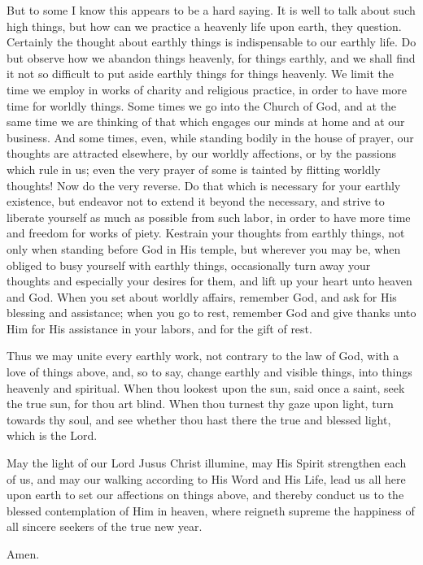 But to some I know this appears to be a hard 
saying. It is well to talk about such high 
things, but how can we practice a heavenly life 
upon earth, they question. Certainly the 
thought about earthly things is indispensable to 
our earthly life. Do but observe how we 
abandon things heavenly, for things earthly, 
and we shall find it not so difficult to put aside 
earthly things for things heavenly. We limit 
the time we employ in works of charity and 
religious practice, in order to have more time 
for worldly things. Some times we go into the 
Church of God, and at the same time we are 
thinking of that which engages our minds at 
home and at our business. And some times, 
even, while standing bodily in the house of 
prayer, our thoughts are attracted elsewhere, 
by our worldly affections, or by the passions 
which rule in us; even the very prayer of some 
is tainted by flitting worldly thoughts! Now do 
the very reverse. Do that which is necessary
for your earthly existence, but endeavor not to 
extend it beyond the necessary, and strive to 
liberate yourself as much as possible from such 
labor, in order to have more time and freedom 
for works of piety. Kestrain your thoughts 
from earthly things, not only when standing 
before God in His temple, but wherever you 
may be, when obliged to busy yourself with 
earthly things, occasionally turn away your 
thoughts and especially your desires for them, 
and lift up your heart unto heaven and God. 
When you set about worldly affairs, remember 
God, and ask for His blessing and assistance; 
when you go to rest, remember God and give 
thanks unto Him for His assistance in your 
labors, and for the gift of rest. 

Thus we may unite every earthly work, not 
contrary to the law of God, with a love of things 
above, and, so to say, change earthly and visible 
things, into things heavenly and spiritual. 
When thou lookest upon the sun, said once a 
saint, seek the true sun, for thou art blind. 
When thou turnest thy gaze upon light, turn 
towards thy soul, and see whether thou hast 
there the true and blessed light, which is the 
Lord. 

May the light of our Lord Jusus Christ illumine,
may His Spirit strengthen each of us, 
and may our walking according to His Word 
and His Life, lead us all here upon earth to set 
our affections on things above, and thereby conduct
us to the blessed contemplation of Him in 
heaven, where reigneth supreme the happiness 
of all sincere seekers of the true new year. 

Amen.
